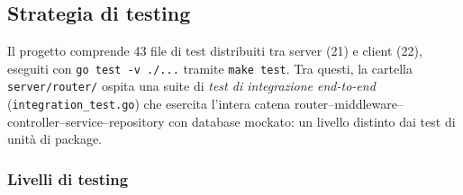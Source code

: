 \documentclass[a4paper,12pt]{article}
\begin{document}
\subsection{Strategia di testing}

Il progetto comprende 43 file di test distribuiti tra server (21) e client (22), eseguiti con \texttt{go test -v ./...} tramite \texttt{make test}. Tra questi, la cartella \texttt{server/router/} ospita una suite di \emph{test di integrazione end-to-end} (\texttt{integration\_test.go}) che esercita l'intera catena router–middleware–controller–service–repository con database mockato: un livello distinto dai test di unità di package.

\newpage
\subsubsection{Livelli di testing}
\end{document}
